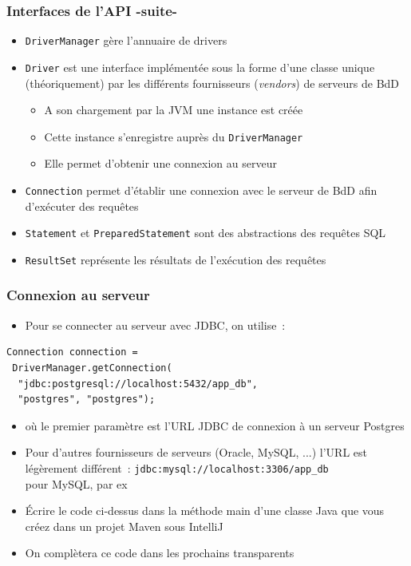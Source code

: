 \documentclass[aspectratio=169,10pt]{beamer}
\begin{document}
\begin{frame}
	\frametitle{Interfaces de l'API -suite-}
	\begin{itemize}
		\item \texttt{DriverManager} gère l'annuaire de drivers
		\item \texttt{Driver} est une interface implémentée sous la forme d'une classe unique (théoriquement) par les différents fournisseurs (\textit{vendors}) de serveurs de BdD 
		\begin{itemize}
			\item A son chargement par la JVM une instance est créée
			\item Cette instance s'enregistre auprès du \texttt{DriverManager}
			\item Elle permet d'obtenir une connexion au serveur
		\end{itemize}		 
		\item \texttt{Connection} permet d'établir une connexion avec le serveur de BdD afin d'exécuter des requêtes
		\item \texttt{Statement} et \texttt{PreparedStatement} sont des abstractions des requêtes SQL
		\item \texttt{ResultSet} représente les résultats de l'exécution des requêtes
	\end{itemize}
\end{frame}

\begin{frame}[fragile]
	\frametitle{Connexion au serveur}

	\begin{itemize}
		\item 	Pour se connecter au serveur avec JDBC, on utilise~:
	\end{itemize}
\begin{lstlisting}
Connection connection =  
 DriverManager.getConnection(
  "jdbc:postgresql://localhost:5432/app_db", 
  "postgres", "postgres");
\end{lstlisting}
\begin{itemize}
\item[] où le premier paramètre est l'URL JDBC de connexion à un serveur Postgres
\item Pour d'autres fournisseurs de serveurs (Oracle, MySQL, ...) l'URL est légèrement différent~:
\texttt{jdbc:mysql://localhost:3306/app\_db}\\ pour MySQL, par ex
 \item Écrire le code ci-dessus dans la méthode main d'une classe Java que vous créez dans un projet Maven sous IntelliJ
 \item On complètera ce code dans les prochains transparents
	\end{itemize}
\end{frame}
\end{document}
